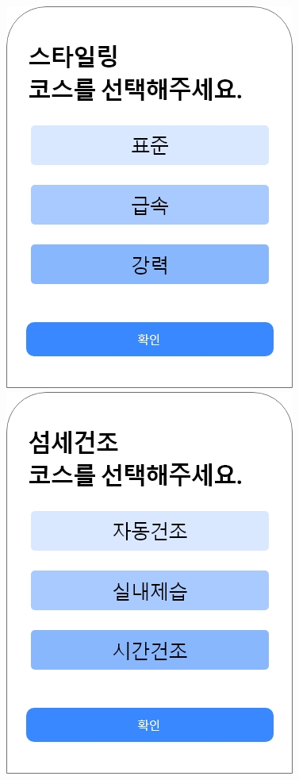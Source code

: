 \documentclass[conference]{IEEEtran}
\begin{document}
\begin{enumerate}
\centerline{\includegraphics[scale=0.3]{스타일링 선택.jpg}
            \includegraphics[scale=0.3]{섬세건조 선택.jpg}} \\ \\

\end{enumerate}
\end{document}

